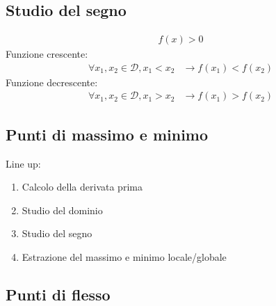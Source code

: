 \documentclass[a4paper]{article}
\begin{document}
		\subsection{Studio del segno}
		\begin{align*}
			f(x) > 0
		\end{align*}
		Funzione crescente:
		\begin{align*}
			\forall x_1,x_2 \in \mathcal{D}, x_1 < x_2 &\to f(x_1)<f(x_2)
		\end{align*}
		Funzione decrescente:
		\begin{align*}
			\forall x_1,x_2 \in \mathcal{D}, x_1 > x_2 &\to f(x_1)>f(x_2)
		\end{align*}

		\subsection{Punti di massimo e minimo}
		Line up:
		\begin{enumerate}
			\item Calcolo della derivata prima
			\item Studio del dominio
			\item Studio del segno
			\item Estrazione del massimo e minimo locale/globale 
		\end{enumerate}
		
		
		\subsection{Punti di flesso}
	
	
	
	
	
	
	
	
	
	
	
	
	
	
	
	
	
	
	
	
	
	
	
	
	
	
	
	
	
	
	
	
	
	
	
	
	
	
	
	
	
	
	
	
	
	
	
	
	
	
	
	
	
	
	
\end{document}
